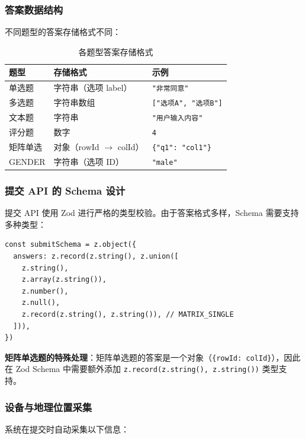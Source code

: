 \subsubsection{答案数据结构}

不同题型的答案存储格式不同：

\begin{table}[H]
\centering
\caption{各题型答案存储格式}
\label{tab:answer-formats}
\begin{tabular}{lll}
\toprule
\textbf{题型} & \textbf{存储格式} & \textbf{示例} \\
\midrule
单选题 & 字符串（选项 label） & \texttt{"非常同意"} \\
多选题 & 字符串数组 & \texttt{["选项A", "选项B"]} \\
文本题 & 字符串 & \texttt{"用户输入内容"} \\
评分题 & 数字 & \texttt{4} \\
矩阵单选 & 对象（rowId $\rightarrow$ colId） & \texttt{\{"q1": "col1"\}} \\
GENDER & 字符串（选项 ID） & \texttt{"male"} \\
\bottomrule
\end{tabular}
\end{table}

\subsubsection{提交 API 的 Schema 设计}

提交 API 使用 Zod 进行严格的类型校验。由于答案格式多样，Schema 需要支持多种类型：

\begin{verbatim}
const submitSchema = z.object({
  answers: z.record(z.string(), z.union([
    z.string(),
    z.array(z.string()),
    z.number(),
    z.null(),
    z.record(z.string(), z.string()), // MATRIX_SINGLE
  ])),
})
\end{verbatim}

\textbf{矩阵单选题的特殊处理}：矩阵单选题的答案是一个对象（\texttt{\{rowId: colId\}}），因此在 Zod Schema 中需要额外添加 \texttt{z.record(z.string(), z.string())} 类型支持。

\subsubsection{设备与地理位置采集}

系统在提交时自动采集以下信息：

